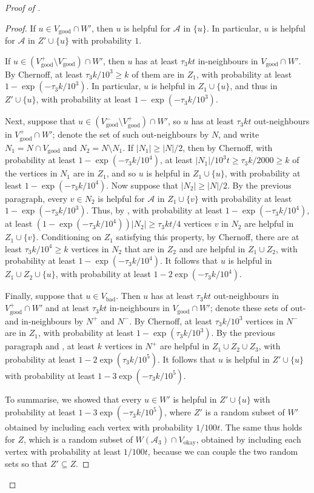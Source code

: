 \documentclass[english]{article}
\theoremstyle{plain}
\theoremstyle{remark}
\def \Np {N^+}
\def \Nm {N^-}
\def \Vgp {V_{\good}^+}
\def \Vgp {V_{\good}^+}
\def \Vgm {V_{\good}^-}
\def \Vo {V_{\okay}}
\def \Vg {V_{\good}}
\def \Vb {V_{\bad}}
\def \Vgm {V_{\good}^-}
\def \Np {N^+}
\def \Nm {N^-}
\newcommand{\A}{\mathcal{A}}
\DeclareMathOperator{\bad}{bad}
\DeclareMathOperator{\good}{good}
\DeclareMathOperator{\okay}{okay}
\begin{document}
\begin{proof}[Proof of ]
\begin{proof}
			If $u \in \Vg \cap W'$, then $u$ is helpful for $\A$ in $\{u\}$. In particular, $u$ is helpful for $\A$ in $Z' \cup \{u\}$ with probability $1$.

			If $u \in (\Vgp \setminus \Vgm) \cap W'$, then $u$ has at least $\tau_3 kt$ in-neighbours in $\Vg \cap W'$. By Chernoff, at least $\tau_3 k / 10^3 \ge k$ of them are in $Z_1$, with probability at least $1 - \exp(-\tau_3 k / 10^3)$. In particular, $u$ is helpful in $Z_1 \cup \{u\}$, and thus in $Z' \cup \{u\}$, with probability at least $1 - \exp(-\tau_3 k / 10^3)$. 

			Next, suppose that $u \in (\Vgm \setminus \Vgp) \cap W'$, so $u$ has at least $\tau_3 kt$ out-neighbours in $\Vgp \cap W'$; denote the set of such out-neighbours by $N$, and write $N_1 = N \cap \Vg$ and $N_2 = N \setminus N_1$. If $|N_1| \ge |N|/2$, then by Chernoff, with probability at least $1 - \exp(-\tau_3 k / 10^4)$, at least $|N_1|/10^3t \ge \tau_3 k / 2000 \ge k$ of the vertices in $N_1$ are in $Z_1$, and so $u$ is helpful in $Z_1 \cup \{u\}$, with probability at least $1 - \exp(-\tau_3 k / 10^4)$. Now suppose that $|N_2| \ge |N|/2$. By the previous paragraph, every $v \in N_2$ is helpful for $\A$ in $Z_1 \cup \{v\}$ with probability at least $1 - \exp(-\tau_3 k / 10^3)$. Thus, by , with probability at least $1 - \exp(-\tau_3 k / 10^4)$, at least $(1 - \exp(-\tau_3 k / 10^4))|N_2| \ge \tau_3 kt / 4$ vertices $v$ in $N_2$ are helpful in $Z_1 \cup \{v\}$. Conditioning on $Z_1$ satisfying this property, by Chernoff, there are at least $\tau_3 k / 10^4 \ge k$ vertices in $N_2$ that are in $Z_2$ and are helpful in $Z_1 \cup Z_2$, with probability at least $1 - \exp(-\tau_3 k / 10^4)$. It follows that $u$ is helpful in $Z_1 \cup Z_2 \cup \{u\}$, with probability at least $1 - 2\exp(-\tau_3 k / 10^4)$. 

			Finally, suppose that $u \in \Vb$. Then $u$ has at least $\tau_3 kt$ out-neighbours in $\Vgp \cap W'$ and at least $\tau_3 kt$ in-neighbours in $\Vg \cap W'$; denote these sets of out- and in-neighbours by $\Np$ and $\Nm$. By Chernoff, at least $\tau_3 k / 10^3$ vertices in $\Nm$ are in $Z_1$, with probability at least $1 - \exp(\tau_3 k / 10^3)$. By the previous paragraph and , at least $k$ vertices in $\Np$ are helpful in $Z_1 \cup Z_2 \cup Z_3$, with probability at least $1 - 2\exp(\tau_3 k / 10^5)$. It follows that $u$ is helpful in $Z' \cup \{u\}$ with probability at least $1 - 3\exp(-\tau_3 k / 10^5)$.

			To summarise, we showed that every $u \in W'$ is helpful in $Z' \cup \{u\}$ with probability at least $1 - 3\exp(-\tau_3 k / 10^5)$, where $Z'$ is a random subset of $W'$ obtained by including each vertex with probability $1/100t$. The same thus holds for $Z$, which is a random subset of $W(\A_3) \cap \Vo$, obtained by including each vertex with probability at least $1/100t$, because we can couple the two random sets so that $Z' \subseteq Z$.
		\end{proof}


\end{proof}
\end{document}
